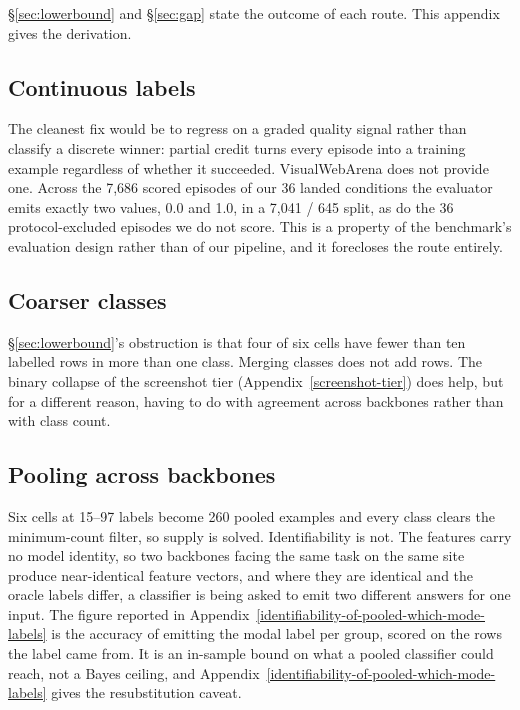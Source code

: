 \S\ref{sec:lowerbound} and \S\ref{sec:gap} state the outcome of each route. This appendix gives the derivation.

\subsection{Continuous labels}\label{continuous-labels}

The cleanest fix would be to regress on a graded quality signal rather than classify a discrete winner: partial credit turns every episode into a training example regardless of whether it succeeded. VisualWebArena does not provide one. Across the 7,686 scored episodes of our 36 landed conditions the evaluator emits exactly two values, 0.0 and 1.0, in a 7,041 / 645 split, as do the 36 protocol-excluded episodes we do not score. This is a property of the benchmark's evaluation design rather than of our pipeline, and it forecloses the route entirely.

\subsection{Coarser classes}\label{coarser-classes}

\S\ref{sec:lowerbound}'s obstruction is that four of six cells have fewer than ten labelled rows in more than one class. Merging classes does not add rows. The binary collapse of the screenshot tier (Appendix~\ref{screenshot-tier}) does help, but for a different reason, having to do with agreement across backbones rather than with class count.

\subsection{Pooling across backbones}\label{pooling-across-backbones}

Six cells at 15--97 labels become 260 pooled examples and every class clears the minimum-count filter, so supply is solved. Identifiability is not. The features carry no model identity, so two backbones facing the same task on the same site produce near-identical feature vectors, and where they are identical and the oracle labels differ, a classifier is being asked to emit two different answers for one input. The figure reported in Appendix~\ref{identifiability-of-pooled-which-mode-labels} is the accuracy of emitting the modal label per group, scored on the rows the label came from. It is an in-sample bound on what a pooled classifier could reach, not a Bayes ceiling, and Appendix~\ref{identifiability-of-pooled-which-mode-labels} gives the resubstitution caveat.

